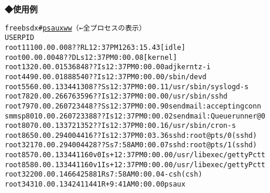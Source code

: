 \noindent
{\bf ◆使用例}
\begin{center}
\begin{breakbox}
\begin{alltt}
freebsdx# \underline{ps auxww} （←全プロセスの表示）
USER    PID %CPU %MEM   VSZ   RSS  TT  STAT STARTED      TIME COMMAND
root     11 100.0  0.0     0     8  ??  RL   12:37PM 1263:15.43 [idle]
root      0  0.0  0.0     0    48  ??  DLs  12:37PM   0:00.08 [kernel]
root    132  0.0  0.0  1536   848  ??  Is   12:37PM   0:00.00 adjkerntz -i
root    449  0.0  0.0  1888   540  ??  Is   12:37PM   0:00.00 /sbin/devd
root    556  0.0  0.1  3344  1308  ??  Ss   12:37PM   0:00.11 /usr/sbin/syslogd -s
root    782  0.0  0.2  6676  3596  ??  Is   12:37PM   0:00.00 /usr/sbin/sshd
root    797  0.0  0.2  6072  3448  ??  Ss   12:37PM   0:00.90 sendmail: accepting conn
smmsp   801  0.0  0.2  6072  3388  ??  Is   12:37PM   0:00.02 sendmail: Queue runner@0
root    807  0.0  0.1  3372  1352  ??  Is   12:37PM   0:00.16 /usr/sbin/cron -s
root    865  0.0  0.2  9400  4416  ??  Is   12:37PM   0:03.36 sshd: root@pts/0 (sshd)
root   3217  0.0  0.2  9400  4428  ??  Ss    7:58AM   0:00.07 sshd: root@pts/1 (sshd)
root    857  0.0  0.1  3344  1160  v0  Is+  12:37PM   0:00.00 /usr/libexec/getty Pc tt
root    858  0.0  0.1  3344  1160  v1  Is+  12:37PM   0:00.00 /usr/libexec/getty Pc tt
root   3220  0.0  0.1  4664  2588   1  Rs    7:58AM   0:00.04 -csh (csh)
root   3431  0.0  0.1  3424  1144   1  R+    9:41AM   0:00.00 ps aux
\end{alltt}
\end{breakbox}
\end{center}
\clearpage
